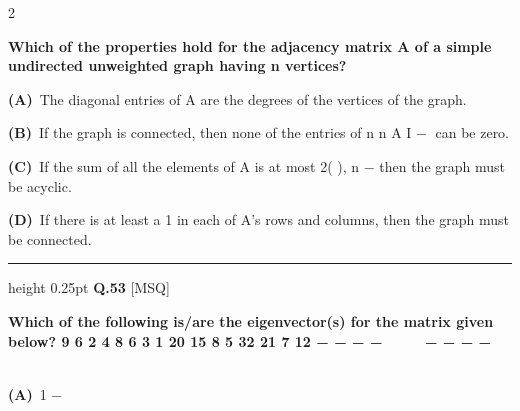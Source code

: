 \documentclass[a4paper,10pt,twoside]{article}
\begin{document}
\begin{multicols}{2}
{\bfseries Which of the properties hold for the adjacency matrix A of a simple undirected
unweighted graph having n vertices? \par}
\par\vspace{2pt}\noindent
\textbf{(A)}~The diagonal entries of  \newline A are the degrees of the vertices of the graph.\par\vspace{2pt}\noindent
\textbf{(B)}~If the graph is connected, then none of the entries of  \newline n \newline n \newline A \newline I \newline − \newline can be zero.\par\vspace{2pt}\noindent
\textbf{(C)}~If the sum of all the elements of A is at most 2( ), \newline n − \newline then the graph must be \newline acyclic.\par\vspace{2pt}\noindent
\textbf{(D)}~If there is at least a 1 in each of A's rows and columns, then the graph must be \newline connected.
\par\vspace{6pt}\hrule height 0.25pt\vspace{6pt}
\noindent\textbf{Q.53} \hfill {\footnotesize\textsf{[MSQ]}}
\par\vspace{2pt}
{\bfseries Which of the following is/are the eigenvector(s) for the matrix given below?
9
6
2
4
8
6
3
1
20
15
8
5
32
21
7
12
−
−
−
−




−
−
−
−







 \par}
\par\vspace{2pt}\noindent
\textbf{(A)}~1    \newline − \newline  \newline  \newline  \newline  \newline  \newline  \newline  \newline  \newline  \newline  \newline  \newline \par\vspace{2pt}\noindent

\end{multicols}
\end{document}
